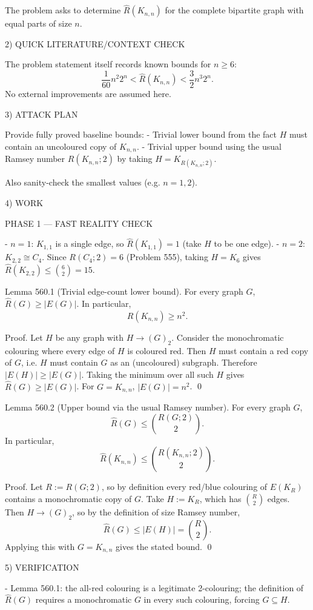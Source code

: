 The problem asks to determine $\hat R(K_{n,n})$ for the complete bipartite graph with equal parts of size $n$.

2) QUICK LITERATURE/CONTEXT CHECK

The problem statement itself records known bounds for $n\ge 6$:
\[
\frac{1}{60}n^2 2^n < \hat R(K_{n,n}) < \frac{3}{2}n^3 2^n.
\]
No external improvements are assumed here.

3) ATTACK PLAN

Provide fully proved baseline bounds:
- Trivial lower bound from the fact $H$ must contain an uncoloured copy of $K_{n,n}$.
- Trivial upper bound using the usual Ramsey number $R(K_{n,n};2)$ by taking $H=K_{R(K_{n,n};2)}$.

Also sanity-check the smallest values (e.g. $n=1,2$).

4) WORK

PHASE 1 — FAST REALITY CHECK

- $n=1$: $K_{1,1}$ is a single edge, so $\hat R(K_{1,1})=1$ (take $H$ to be one edge).
- $n=2$: $K_{2,2}\cong C_4$. Since $R(C_4;2)=6$ (Problem 555), taking $H=K_6$ gives $\hat R(K_{2,2})\le \binom{6}{2}=15$.

Lemma 560.1 (Trivial edge-count lower bound).
For every graph $G$, $\hat R(G)\ge |E(G)|$.
In particular,
\[
\hat R(K_{n,n})\ge n^2.
\]

Proof.
Let $H$ be any graph with $H\to (G)_2$.
Consider the monochromatic colouring where every edge of $H$ is coloured red.
Then $H$ must contain a red copy of $G$, i.e. $H$ must contain $G$ as an (uncoloured) subgraph.
Therefore $|E(H)|\ge |E(G)|$.
Taking the minimum over all such $H$ gives $\hat R(G)\ge |E(G)|$.
For $G=K_{n,n}$, $|E(G)|=n^2$.
\qed

Lemma 560.2 (Upper bound via the usual Ramsey number).
For every graph $G$,
\[
\hat R(G)\le \binom{R(G;2)}{2}.
\]
In particular,
\[
\hat R(K_{n,n})\le \binom{R(K_{n,n};2)}{2}.
\]

Proof.
Let $R:=R(G;2)$, so by definition every red/blue colouring of $E(K_R)$ contains a monochromatic copy of $G$.
Take $H:=K_R$, which has $\binom{R}{2}$ edges.
Then $H\to (G)_2$, so by the definition of size Ramsey number,
\[
\hat R(G)\le |E(H)|=\binom{R}{2}.
\]
Applying this with $G=K_{n,n}$ gives the stated bound.
\qed

5) VERIFICATION

- Lemma 560.1: the all-red colouring is a legitimate 2-colouring; the definition of $\hat R(G)$ requires a monochromatic $G$ in every such colouring, forcing $G\subseteq H$.

